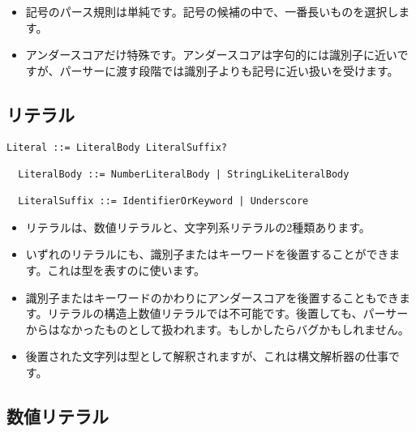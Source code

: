 \documentclass[dvipdfmx,uplatex,papersize,a4paper,10pt]{jsbook}
\theoremstyle{definition}
\begin{document}
\begin{itemize}
  \item 記号のパース規則は単純です。記号の候補の中で、一番長いものを選択します。
  \item アンダースコアだけ特殊です。アンダースコアは字句的には識別子に近いですが、パーサーに渡す段階では識別子よりも記号に近い扱いを受けます。
\end{itemize}

\subsection{リテラル}

\begin{lstlisting}[language=BNFLike, gobble=2]
  Literal ::= LiteralBody LiteralSuffix?

  LiteralBody ::= NumberLiteralBody | StringLikeLiteralBody

  LiteralSuffix ::= IdentifierOrKeyword | Underscore
\end{lstlisting}

\begin{itemize}
  \item リテラルは、数値リテラルと、文字列系リテラルの2種類あります。
  \item いずれのリテラルにも、識別子またはキーワードを後置することができます。これは型を表すのに使います。
  \item 識別子またはキーワードのかわりにアンダースコアを後置することもできます。リテラルの構造上数値リテラルでは不可能です。後置しても、パーサーからはなかったものとして扱われます。もしかしたらバグかもしれません。
  \item 後置された文字列は型として解釈されますが、これは構文解析器の仕事です。
\end{itemize}

\subsection{数値リテラル}
\end{document}
